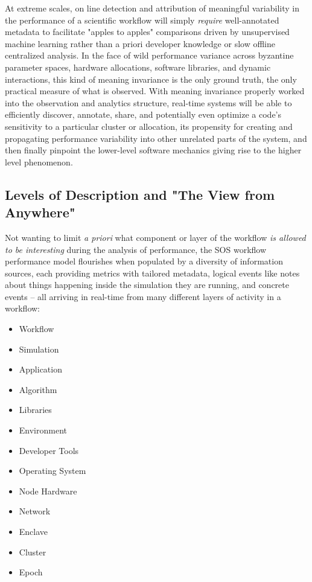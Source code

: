 At extreme scales, on line detection and attribution of meaningful
variability in the performance of a scientific workflow will
simply \textit{require} well-annotated metadata to facilitate "apples
to apples" comparisons driven by unsupervised machine learning rather
than a priori developer knowledge or slow offline centralized
analysis. In the face of wild performance variance across byzantine
parameter spaces, hardware allocations, software libraries, and
dynamic interactions, this kind of meaning invariance is the only
ground truth, the only practical measure of what is observed. With
meaning invariance properly worked into the observation and analytics
structure, real-time systems will be able to efficiently discover,
annotate, share, and potentially even optimize a code's sensitivity to
a particular cluster or allocation, its propensity for creating and
propagating performance variability into other unrelated parts of the
system, and then finally pinpoint the lower-level software mechanics
giving rise to the higher level phenomenon.



\subsection{Levels of Description and "The View from Anywhere"}
Not wanting to limit \textit{a priori} what component or layer of the
workflow \textit{is allowed to be interesting} during the analysis of
performance, the SOS workflow performance model flourishes when
populated by a diversity of information sources, each providing
metrics with tailored metadata, logical events like notes about things
happening inside the simulation they are running, and concrete events
-- all arriving in real-time from many different layers of activity in
a workflow:
\begin{itemize}
    \item Workflow
    \item Simulation
    \item Application
    \item Algorithm
    \item Libraries
    \item Environment
    \item Developer Tools
    \item Operating System
    \item Node Hardware
    \item Network
    \item Enclave
    \item Cluster
    \item Epoch	
\end{itemize}


